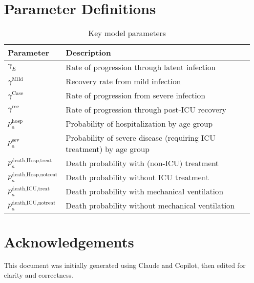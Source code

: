 \documentclass[12pt]{article}
\begin{document}
\section{Parameter Definitions}

\begin{table}[H]
\centering
\begin{tabular}{ll}
\toprule
Parameter & Description \\
\midrule
$\gamma_E$ & Rate of progression through latent infection \\
$\gamma^{\text{Mild}}$ & Recovery rate from mild infection \\
$\gamma^{\text{Case}}$ & Rate of progression from severe infection \\
$\gamma^{\text{rec}}$ & Rate of progression through post-ICU recovery \\
$p^{\text{hosp}}_a$ & Probability of hospitalization by age group \\
$p^{\text{sev}}_a$ & Probability of severe disease (requiring ICU treatment) by age group \\
$p^{\text{death,Hosp,treat}}_a$ & Death probability with (non-ICU) treatment \\
$p^{\text{death,Hosp,notreat}}_a$ & Death probability without ICU treatment \\
$p^{\text{death,ICU,treat}}_a$ & Death probability with mechanical ventilation \\
$p^{\text{death,ICU,notreat}}_a$ & Death probability without mechanical ventilation \\
\bottomrule
\end{tabular}
\caption{Key model parameters}
\end{table}

\section{Acknowledgements}

This document was initially generated using Claude and Copilot, then edited for clarity and correctness.
\end{document}

